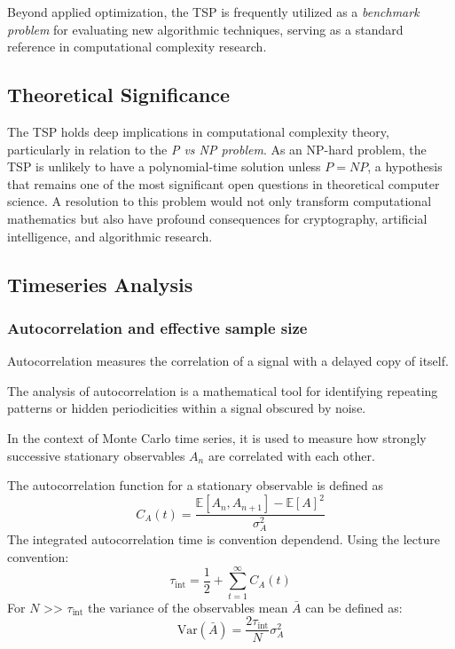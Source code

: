 Beyond applied optimization, the TSP is frequently utilized as a \textit{benchmark problem} for evaluating new algorithmic techniques, serving as a standard reference in computational complexity research.

\subsection{Theoretical Significance}
The TSP holds deep implications in computational complexity theory, particularly in relation to the \textit{P vs NP problem}. As an NP-hard problem, the TSP is unlikely to have a polynomial-time solution unless \( P = NP \), a hypothesis that remains one of the most significant open questions in theoretical computer science. A resolution to this problem would not only transform computational mathematics but also have profound consequences for cryptography, artificial intelligence, and algorithmic research.

\subsection{Timeseries Analysis}
\subsubsection{Autocorrelation and effective sample size}
Autocorrelation measures the correlation of a signal with a delayed copy of itself. 

The analysis of autocorrelation is a mathematical tool for identifying repeating patterns or hidden periodicities within a signal obscured by noise.

In the context of Monte Carlo time series, it is used to measure how strongly successive stationary observables $A_n$ are correlated with each other.

The autocorrelation function for a stationary observable is defined as
\begin{equation}
    C_A (t) = \frac{\mathbb{E}[A_n, A_{n+1}] - \mathbb{E}[A]^2}{\sigma_A^2}
    \label{eq:autocorrelation_func}
\end{equation}
The integrated autocorrelation time is convention dependend. Using the lecture convention:
\begin{equation}
    \tau_{\mathrm{int}} = \frac{1}{2} + \sum_{t=1}^{\infty} C_A (t)
    \label{eq:autocorrelation_time}
\end{equation}
For $N$ >> $\tau_{\mathrm{int}}$ the variance of the observables mean $\bar{A}$ can be defined as:
\begin{equation}
    \mathrm{Var}(\bar{A}) = \frac{2 \tau_{\mathrm{int}}}{N} \sigma_A^2
    \label{eq:variance_mean}
\end{equation}

